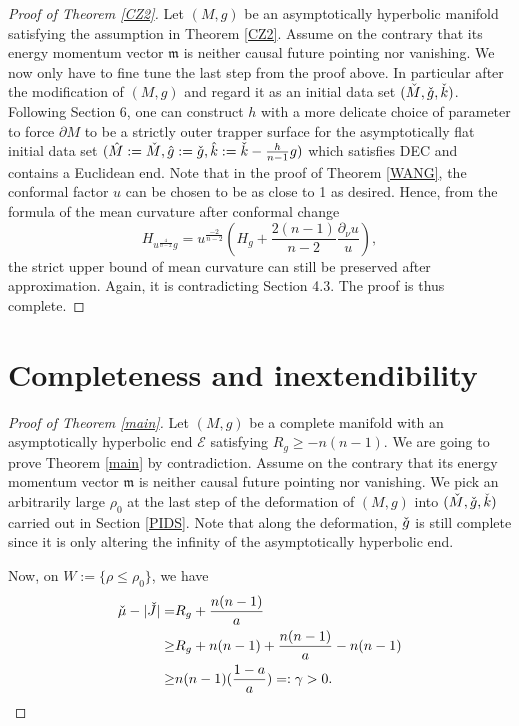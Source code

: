 \documentclass[11pt]{amsart}
\newcommand{\be}{\begin{equation}}
\newcommand{\ee}{\end{equation}}
\theoremstyle{remark}
\numberwithin{equation}{section}
\def\be{\begin{equation}}
\def\ee{\end{equation}}
\def\p{\partial}
\def\m{\mathfrak{m}}
\def\mE{\mathcal{E}}
\def\mE{\mathcal{E}}
\def\h {\hat}
\begin{document}
{{\begin{proof}[Proof of Theorem \ref{CZ2}]
Let $(M,g)$ be an asymptotically hyperbolic manifold satisfying the assumption in Theorem \ref{CZ2}. Assume on the contrary that its energy momentum vector $\m$ is neither causal future pointing nor vanishing. We now only have to fine tune the last step from the proof above. In particular after the modification of $(M,g)$ and regard it as an initial data set $(\Check M, \Check g, \Check k)$. Following \cite{LLU22} Section 6, one can construct $h$ with a more delicate choice of parameter to force $\p M$ to be a strictly outer trapper surface for the asymptotically flat initial data set $(\h M:=\Check M, \h g:= \Check g, \hat k:=\Check k-\frac{h}{n-1}g)$ which satisfies DEC and contains a Euclidean end. Note that in the proof of Theorem \ref{WANG}, the conformal factor $u$ can be chosen to be as close to 1 as desired. Hence, from the formula of the mean curvature after conformal change 
\begin{equation}
H_{u^{\frac{4}{n-2}}g}=u^{\frac{-2}{n-2}}\left(H_g+\frac{2(n-1)}{n-2}\frac{\p_{\nu} u}{u}\right) , 
\end{equation}
the strict upper bound of mean curvature can still be preserved after approximation. Again, it is contradicting \cite{LLU22} Section 4.3. The proof is thus complete. 
\end{proof}

\section{Completeness and inextendibility}\label{complete}
\begin{proof}[Proof of Theorem \ref{main}]
Let $(M,g)$ be a complete manifold with an asymptotically hyperbolic end $\mE$ satisfying $R_g\geq -n(n-1)$. We are going to prove Theorem \ref{main} by contradiction. Assume on the contrary that its energy momentum vector $\m$ is neither causal future pointing nor vanishing. 
We pick an arbitrarily large $\rho_0$ at the last step of the deformation of $(M,g)$ into $(\Check M, \Check g, \Check k)$ carried out in Section \ref{PIDS}. Note that along the deformation, $\Check g$ is still complete since it is only altering the infinity of the asymptotically hyperbolic end. 


Now, on $W:=\{\rho\leq \rho_0\}$, we have 
\be 
\begin{split}
\Check \mu- |\Check J|= & R_g+\frac{n(n-1)}{a} \\
\geq & R_g+n(n-1)+\frac{n(n-1)}{a}-n(n-1)\\
\geq & n(n-1)(\frac{1-a}{a})=:\gamma>0. 
\end{split}
\ee 


\end{proof}}}
\end{document}
